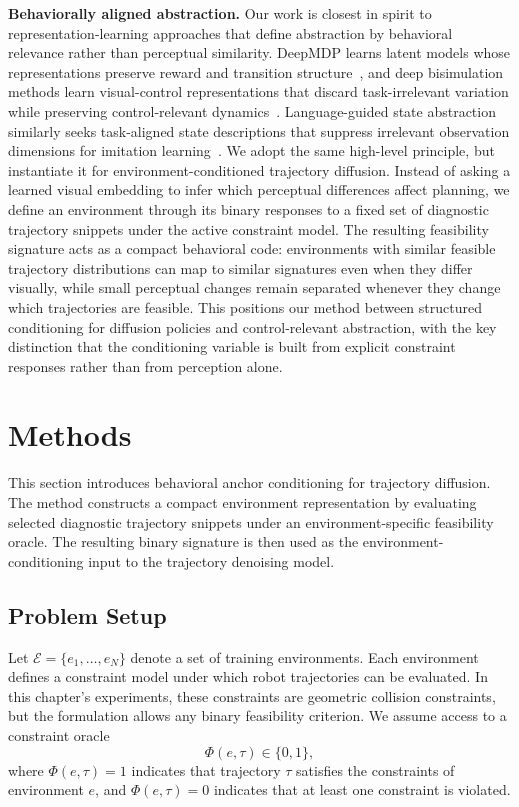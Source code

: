 \textbf{Behaviorally aligned abstraction.}
Our work is closest in spirit to representation-learning approaches that define abstraction by behavioral relevance rather than perceptual similarity. DeepMDP learns latent models whose representations preserve reward and transition structure~\cite{gelada2019deepmdp}, and deep bisimulation methods learn visual-control representations that discard task-irrelevant variation while preserving control-relevant dynamics~\cite{zhang2020invariant}. Language-guided state abstraction similarly seeks task-aligned state descriptions that suppress irrelevant observation dimensions for imitation learning~\cite{peng2024languageguided}. We adopt the same high-level principle, but instantiate it for environment-conditioned trajectory diffusion. Instead of asking a learned visual embedding to infer which perceptual differences affect planning, we define an environment through its binary responses to a fixed set of diagnostic trajectory snippets under the active constraint model. The resulting feasibility signature acts as a compact behavioral code: environments with similar feasible trajectory distributions can map to similar signatures even when they differ visually, while small perceptual changes remain separated whenever they change which trajectories are feasible. This positions our method between structured conditioning for diffusion policies and control-relevant abstraction, with the key distinction that the conditioning variable is built from explicit constraint responses rather than from perception alone.



\section{Methods}\label{sec:methods}

This section introduces behavioral anchor conditioning for trajectory diffusion. The method constructs a compact environment representation by evaluating selected diagnostic trajectory snippets under an environment-specific feasibility oracle. The resulting binary signature is then used as the environment-conditioning input to the trajectory denoising model.

\subsection{Problem Setup}

Let $\mathcal{E}=\{e_1,\ldots,e_N\}$ denote a set of training environments. Each environment defines a constraint model under which robot trajectories can be evaluated. In this chapter's experiments, these constraints are geometric collision constraints, but the formulation allows any binary feasibility criterion. We assume access to a constraint oracle
%
\begin{equation}
\Phi(e,\tau) \in \{0,1\},
\end{equation}
%
where $\Phi(e,\tau)=1$ indicates that trajectory $\tau$ satisfies the constraints of environment $e$, and $\Phi(e,\tau)=0$ indicates that at least one constraint is violated.

